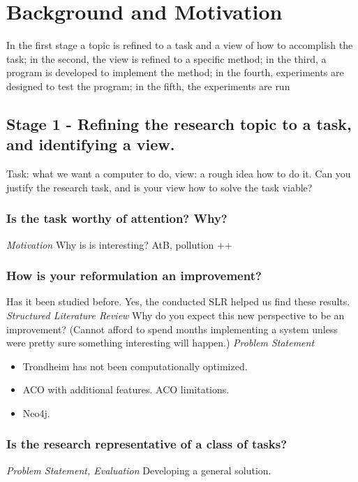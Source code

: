 \section{Background and Motivation}


In the first stage a topic is refined to a task and a view of how to accomplish the task; in the second, the view is refined to a specific method; in the third, a program is developed to implement the method; in the fourth, experiments are designed to test the program; in the fifth, the experiments are run\citep{cohen88}

\subsection{Stage 1 - Refining the research topic to a task, and identifying a view.}
Task: what we want a computer to do, view: a rough idea how to do it. Can you justify the research task, and is your view how to solve the task viable? 

\subsubsection{Is the task worthy of attention? Why?}
\emph{\color{orange} Motivation}
Why is is interesting? AtB, pollution ++ 

\subsubsection{How is your reformulation an improvement?}

Has it been studied before. Yes, the conducted SLR helped us find these results.\emph{\color{orange} Structured Literature Review}
Why do you expect this new perspective to be an improvement? (Cannot afford to spend months implementing a system unless were pretty sure something interesting will happen.)\emph{\color{orange} Problem Statement}
\begin{itemize}
\item Trondheim has not been computationally optimized.
\item ACO with additional features. ACO limitations.
\item Neo4j.
\end{itemize}

\subsubsection{Is the research representative of a class of tasks?}
\emph{\color{orange} Problem Statement, Evaluation}
Developing a general solution.


